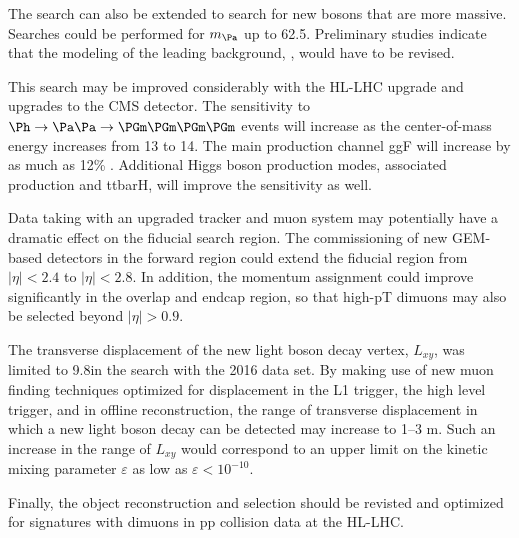 The search can also be extended to search for new bosons that are more massive. Searches could be performed for $\ma$ up to 62.5\GeV. Preliminary studies indicate that the modeling of the leading background, \bbbar, would have to be revised.

This search may be improved considerably with the HL-LHC upgrade and upgrades to the CMS detector.
The sensitivity to $\Ph\to\Pa\Pa\to\PGm\PGm\PGm\PGm$ events will increase as the center-of-mass energy increases from 13 to 14\TeV. The main production channel ggF will increase by as much as 12\% \cite{deFlorian:2016spz}. Additional Higgs boson production modes, associated production and ttbarH, will improve the sensitivity as well.

Data taking with an upgraded tracker and muon system may potentially have a dramatic effect on the fiducial search region.
The commissioning of new GEM-based detectors in the forward region could extend the fiducial region from $|\eta| < 2.4$ to $|\eta| < 2.8$. In addition, the momentum assignment could improve significantly in the overlap and endcap region, so that high-pT dimuons may also be selected beyond $|\eta| > 0.9$.

The transverse displacement of the new light boson decay vertex, $L_{xy}$, was limited to 9.8\cm in the search with the 2016 data set. By making use of new muon finding techniques optimized for displacement in the L1 trigger, the high level trigger, and in offline reconstruction, the range of transverse displacement in which a new light boson decay can be detected may increase to {1--3 m}. %
Such an increase in the range of $L_{xy}$ would correspond to an upper limit on the kinetic mixing parameter $\varepsilon$ as low as $\varepsilon<10^{-10}$.

Finally, the object reconstruction and selection should be revisted and optimized for signatures with dimuons in pp collision data at the HL-LHC.

